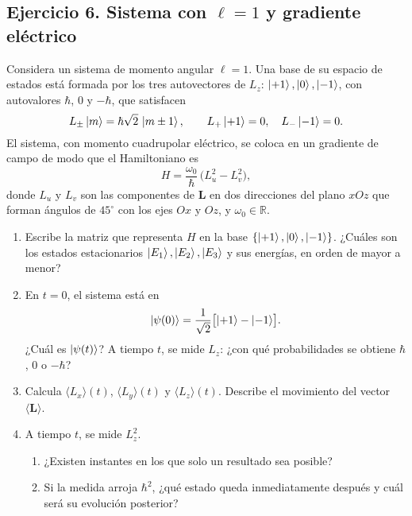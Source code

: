 \documentclass[a4paper,11pt]{article}
\begin{document}
\subsection*{Ejercicio 6. Sistema con \(\ell=1\) y gradiente eléctrico}
Considera un sistema de momento angular \(\ell=1\). Una base de su espacio de estados está formada por los tres autovectores de \(L_z\): \(\ket{+1},\ket{0},\ket{-1}\), con autovalores \(\hbar\), \(0\) y \(-\hbar\), que satisfacen
\[
L_\pm\ket{m} = \hbar\sqrt{2}\,\ket{m\pm1},\qquad
L_+\ket{+1} = 0,\quad L_-\ket{-1} = 0.
\]
El sistema, con momento cuadrupolar eléctrico, se coloca en un gradiente de campo de modo que el Hamiltoniano es
\[
H = \frac{\omega_0}{\hbar}\,\bigl(L_u^2 - L_v^2\bigr),
\]
donde \(L_u\) y \(L_v\) son las componentes de \(\mathbf{L}\) en dos direcciones del plano \(xOz\) que forman ángulos de \(45^\circ\) con los ejes \(Ox\) y \(Oz\), y \(\omega_0\in\mathbb{R}\).

\begin{enumerate}
  \item Escribe la matriz que representa \(H\) en la base \(\{\ket{+1},\ket{0},\ket{-1}\}\).  
        ¿Cuáles son los estados estacionarios \(\ket{E_1},\ket{E_2},\ket{E_3}\) y sus energías, en orden de mayor a menor?
  \item En \(t=0\), el sistema está en
        \[
          \ket{\psi(0)} 
          = \frac{1}{\sqrt{2}}\bigl[\ket{+1} - \ket{-1}\bigr].
        \]
        ¿Cuál es \(\ket{\psi(t)}\)? A tiempo \(t\), se mide \(L_z\): ¿con qué probabilidades se obtiene \(\hbar\), \(0\) o \(-\hbar\)?
  \item Calcula \(\langle L_x\rangle(t)\), \(\langle L_y\rangle(t)\) y \(\langle L_z\rangle(t)\).  
        Describe el movimiento del vector \(\langle\mathbf{L}\rangle\).
  \item A tiempo \(t\), se mide \(L_z^2\).
    \begin{enumerate}
      \item ¿Existen instantes en los que solo un resultado sea posible?
      \item Si la medida arroja \(\hbar^2\), ¿qué estado queda inmediatamente después y cuál será su evolución posterior?
    \end{enumerate}
\end{enumerate}
\end{document}
